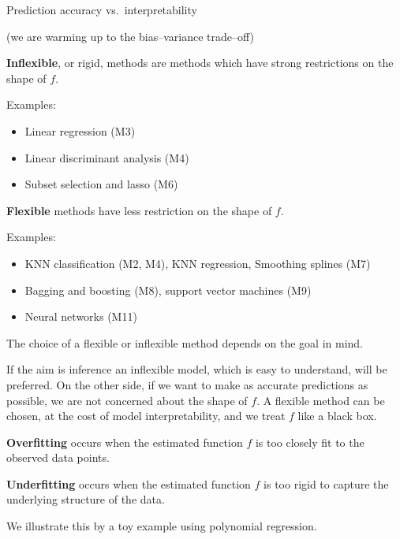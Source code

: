 \documentclass[ignorenonframetext,]{beamer}
\providecommand{\tightlist}{%
  \setlength{\itemsep}{0pt}\setlength{\parskip}{0pt}}
\begin{document}
\begin{frame}{Prediction accuracy vs.~interpretability}

(we are warming up to the bias--variance trade--off)

\textbf{Inflexible}, or rigid, methods are methods which have strong
restrictions on the shape of \(f\).

Examples:

\begin{itemize}
\tightlist
\item
  Linear regression (M3)
\item
  Linear discriminant analysis (M4)
\item
  Subset selection and lasso (M6)
\end{itemize}

\textbf{Flexible} methods have less restriction on the shape of \(f\).

Examples:

\begin{itemize}
\tightlist
\item
  KNN classification (M2, M4), KNN regression, Smoothing splines (M7)
\item
  Bagging and boosting (M8), support vector machines (M9)
\item
  Neural networks (M11)
\end{itemize}

\end{frame}

\begin{frame}

The choice of a flexible or inflexible method depends on the goal in
mind.

If the aim is inference an inflexible model, which is easy to
understand, will be preferred. On the other side, if we want to make as
accurate predictions as possible, we are not concerned about the shape
of \(f\). A flexible method can be chosen, at the cost of model
interpretability, and we treat \(f\) like a black box.

\textbf{Overfitting} occurs when the estimated function \(f\) is too
closely fit to the observed data points.

\textbf{Underfitting} occurs when the estimated function \(f\) is too
rigid to capture the underlying structure of the data.

We illustrate this by a toy example using polynomial regression.

\end{frame}
\end{document}

